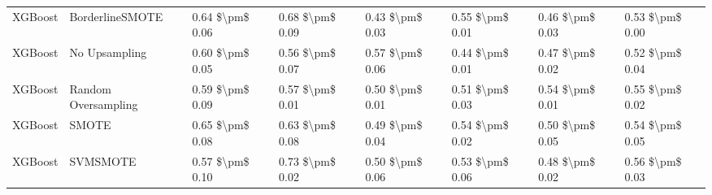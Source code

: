 \begin{tabular}{llllllll}
                        XGBoost &               BorderlineSMOTE &     0.64 \$\textbackslash pm\$ 0.06 &           0.68 \$\textbackslash pm\$ 0.09 &       0.43 \$\textbackslash pm\$ 0.03 &        0.55 \$\textbackslash pm\$ 0.01 &                         0.46 \$\textbackslash pm\$ 0.03 & 0.53 \$\textbackslash pm\$ 0.00 \\
                        XGBoost &                 No Upsampling &     0.60 \$\textbackslash pm\$ 0.05 &           0.56 \$\textbackslash pm\$ 0.07 &       0.57 \$\textbackslash pm\$ 0.06 &        0.44 \$\textbackslash pm\$ 0.01 &                         0.47 \$\textbackslash pm\$ 0.02 & 0.52 \$\textbackslash pm\$ 0.04 \\
                        XGBoost &           Random Oversampling &     0.59 \$\textbackslash pm\$ 0.09 &           0.57 \$\textbackslash pm\$ 0.01 &       0.50 \$\textbackslash pm\$ 0.01 &        0.51 \$\textbackslash pm\$ 0.03 &                         0.54 \$\textbackslash pm\$ 0.01 & 0.55 \$\textbackslash pm\$ 0.02 \\
                        XGBoost &                         SMOTE &     0.65 \$\textbackslash pm\$ 0.08 &           0.63 \$\textbackslash pm\$ 0.08 &       0.49 \$\textbackslash pm\$ 0.04 &        0.54 \$\textbackslash pm\$ 0.02 &                         0.50 \$\textbackslash pm\$ 0.05 & 0.54 \$\textbackslash pm\$ 0.05 \\
                        XGBoost &                      SVMSMOTE &     0.57 \$\textbackslash pm\$ 0.10 &           0.73 \$\textbackslash pm\$ 0.02 &       0.50 \$\textbackslash pm\$ 0.06 &        0.53 \$\textbackslash pm\$ 0.06 &                         0.48 \$\textbackslash pm\$ 0.02 & 0.56 \$\textbackslash pm\$ 0.03 \\
\bottomrule
\end{tabular}
